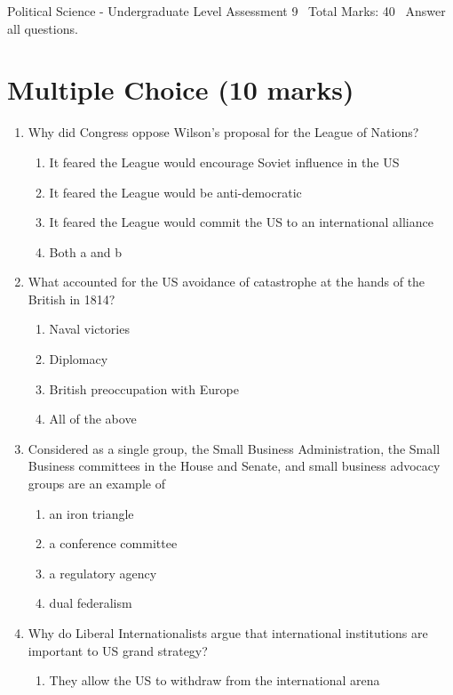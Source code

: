 \documentclass[12pt]{article}
\begin{document}
\begin{center}
Political Science - Undergraduate Level Assessment 9 \
Total Marks: 40 \
Answer all questions.
\end{center}

\section*{Multiple Choice (10 marks)}
\begin{enumerate}[label=\arabic*.]
\item Why did Congress oppose Wilson's proposal for the League of Nations?
\begin{enumerate}[label=(\alph*)]
    \item It feared the League would encourage Soviet influence in the US
    \item It feared the League would be anti-democratic
    \item It feared the League would commit the US to an international alliance
    \item Both a and b
\end{enumerate}
\item What accounted for the US avoidance of catastrophe at the hands of the British in 1814?
\begin{enumerate}[label=(\alph*)]
    \item Naval victories
    \item Diplomacy
    \item British preoccupation with Europe
    \item All of the above
\end{enumerate}
\item Considered as a single group, the Small Business Administration, the Small Business committees in the House and Senate, and small business advocacy groups are an example of
\begin{enumerate}[label=(\alph*)]
    \item an iron triangle
    \item a conference committee
    \item a regulatory agency
    \item dual federalism
\end{enumerate}
\item Why do Liberal Internationalists argue that international institutions are important to US grand strategy?
\begin{enumerate}[label=(\alph*)]
    \item They allow the US to withdraw from the international arena

\end{enumerate}
\end{enumerate}
\end{document}

